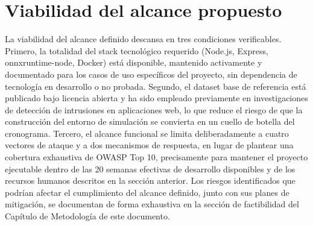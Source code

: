 \section{Viabilidad del alcance propuesto}
La viabilidad del alcance definido descansa en tres condiciones verificables. Primero, la totalidad
del stack tecnológico requerido (Node.js, Express, onnxruntime-node, Docker) está disponible,
mantenido activamente y documentado para los casos de uso específicos del proyecto, sin
dependencia de tecnología en desarrollo o no probada. Segundo, el dataset base de referencia está
publicado bajo licencia abierta y ha sido empleado previamente en investigaciones de detección de
intrusiones en aplicaciones web, lo que reduce el riesgo de que la construcción del entorno de
simulación se convierta en un cuello de botella del cronograma. Tercero, el alcance funcional se
limita deliberadamente a cuatro vectores de ataque y a dos mecanismos de respuesta, en lugar de
plantear una cobertura exhaustiva de OWASP Top 10, precisamente para mantener el proyecto
ejecutable dentro de las 20 semanas efectivas de desarrollo disponibles y de los recursos humanos
descritos en la sección anterior. Los riesgos identificados que podrían afectar el cumplimiento del
alcance definido, junto con sus planes de mitigación, se documentan de forma exhaustiva en la
sección de factibilidad del Capítulo de Metodología de este documento.

\ifdefined\modoensamble
\else
	
\fi
